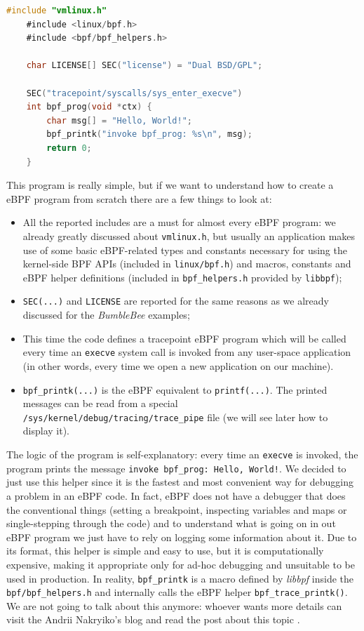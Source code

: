 \begin{lstlisting}[language=C, caption={``Hello world!'' kernel side program using libbpf-bootstrap}, title=example\_helloworld.bpf.c]
	#include "vmlinux.h"
	#include <linux/bpf.h>
	#include <bpf/bpf_helpers.h>
	
	char LICENSE[] SEC("license") = "Dual BSD/GPL";
	
	SEC("tracepoint/syscalls/sys_enter_execve")
	int bpf_prog(void *ctx) {
		char msg[] = "Hello, World!";
		bpf_printk("invoke bpf_prog: %s\n", msg);
		return 0;
	}
\end{lstlisting}

This program is really simple, but if we want to understand how to create a eBPF program from scratch there are a few things to look at:

\begin{itemize}
	\item All the reported includes are a must for almost every eBPF program: we 
		already	greatly discussed about \verb|vmlinux.h|, but usually an application makes use of some basic eBPF-related types and constants necessary for using the kernel-side BPF APIs (included in \verb|linux/bpf.h|) and macros, constants and eBPF helper definitions (included in \verb|bpf_helpers.h| provided by \verb|libbpf|);
	\item \verb|SEC(...)| and \verb|LICENSE| are reported for the same reasons as we 
		already discussed for the \textit{BumbleBee} examples;
	\item This time the code defines a tracepoint eBPF program which will be called 
		every time an \verb|execve| system call is invoked from any user-space application (in other words, every time we open a new application on our machine).
	\item \verb|bpf_printk(...)| is the eBPF equivalent to \verb|printf(...)|.
		The printed messages can be read from a special \verb|/sys/kernel/debug/tracing/trace_pipe| file (we will see later how to display it).
\end{itemize}

The logic of the program is self-explanatory: every time an \verb|execve| is invoked, the program prints the message \verb|invoke bpf_prog: Hello, World!|.
We decided to just use this helper since it is the fastest and most convenient way for debugging a problem in an eBPF code.
In fact, eBPF does not have a debugger that does the conventional things (setting a breakpoint, inspecting variables and maps or single-stepping through the code) and to understand what is going on in out eBPF program we just have to rely on logging some information about it.
Due to its format, this helper is simple and easy to use, but it is computationally expensive, making it appropriate only for ad-hoc debugging and unsuitable to be used in production.
In reality, \verb|bpf_printk| is a macro defined by \textit{libbpf} inside the \verb|bpf/bpf_helpers.h| and internally calls the eBPF helper \verb|bpf_trace_printk()|.
We are not going to talk about this anymore: whoever wants more details can visit the Andrii Nakryiko's blog and read the post about this topic \cite{ANbpfprintk}.

